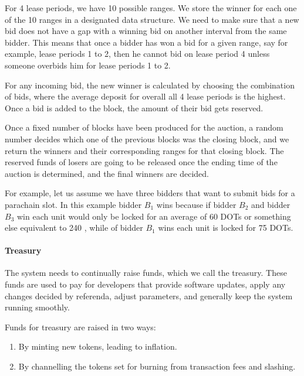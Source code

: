 For 4 lease periods, we have 10 possible ranges.
We store the winner for each one of the 10 ranges in a designated data structure.
We need to make sure that a new bid does not have a gap with a winning bid on another interval from the same bidder.
This means that once a bidder has won a bid for a given range, say for example, lease periods 1 to 2, then he cannot bid on lease period 4 unless someone overbids him for lease periods 1 to 2.

For any incoming bid, the new winner is calculated by choosing the combination of bids, where the average deposit for overall all 4 lease periods is the highest.
Once a bid is added to the block, the amount of their bid gets reserved.

Once a fixed number of blocks have been produced for the auction, a random number decides which one of the previous blocks was the closing block, and we return the winners and their corresponding ranges for that closing block.
The reserved funds of losers are going to be released once the ending time of the auction is determined, and the final winners are decided.

For example, let us assume we have three bidders that want to submit bids for a parachain slot.
In this example bidder $B_1$ wins because if bidder $B_2$ and bidder $B_3$ win each unit would only be locked for an average of 60 DOTs or something else equivalent to 240 , while of bidder $B_1$ wins each unit is locked for 75 DOTs.

 \paragraph{Treasury\eray{}{:}}

 The system needs to continually raise funds, which we call the treasury.
 These funds are used to pay for developers that provide software updates, apply any changes decided by referenda, adjust parameters, and generally keep the system running smoothly.

Funds for treasury are raised in two ways:

{
\begin{enumerate}
\item By minting new tokens, leading to inflation.
\item By channelling the tokens set for burning from transaction fees and slashing.
\end{enumerate}
}

